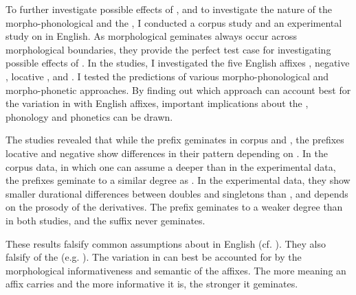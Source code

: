 To further investigate possible effects of , and to investigate the nature of the morpho-phonological and the , I conducted a corpus study and an experimental study on  in English.  As morphological {geminates} always occur across morphological boundaries, they provide the perfect test case for investigating possible effects of . 
 In the studies, I investigated the five English affixes , negative , locative ,  and . I tested the predictions of various morpho-phonological and morpho-phonetic approaches. By finding out which approach can account best for the variation in  with English affixes, important implications about the , phonology and phonetics can be drawn.



 
The studies revealed that while the prefix  geminates in corpus and , the prefixes locative  and negative  show differences in their  pattern depending on . In the corpus data, in which one can assume a deeper  than in the experimental data, the prefixes geminate to a similar degree as . In the experimental data, they show smaller durational differences between doubles and singletons than , and  depends on the prosody of the derivatives. The prefix  geminates to a weaker degree than  in both studies, and the suffix   never geminates.

These results falsify common assumptions about  in English (cf. ). They also falsify  of the  (e.g. \citealt{Kiparsky.1982,Kiparsky.1985,Mohanan.1986,BermudezOtero.2012,Kiparsky.2015,BermudezOtero.2017}). 
The variation in  can best be accounted for by the morphological informativeness and semantic  of the affixes. The more meaning an affix carries and the more informative it is, the stronger it geminates. 

